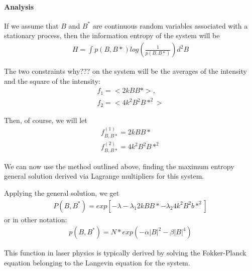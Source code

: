 \documentclass[10 pt,final]{article}
\newcommand{\impo}[1]{{\color{magenta} #1}}
\newcommand{\question}[1]{{\color{blue} #1}}
\begin{document}
\paragraph{Analysis}
If we assume that $B$ and $B^*$ are continuous random variables associated with a stationary process, then the \impo{information entropy} of the system will be
\begin{align*}
H = \int p(B,B*) log(\frac{1}{p(B,B*)}) d^2B
\end{align*}

The \impo{two constraints} \question{why???} on the system will be the averages of the intensity and the square of the intensity:
\begin{align*}
f_1 = <2kBB*>,\\
f_2 = <4k^2B^2B*^2>
\end{align*}

Then, of course, we will let
\begin{align*}
f^{(1)}_{B,B*} = 2kBB* \\
f^{(2)}_{B,B*} = 4k^2B^2B*^2
\end{align*}


We can now use the method outlined above, finding the maximum entropy general solution derived via Lagrange multipliers for this system.

Applying the general solution, we get 
\begin{align*}
P(B,B^*) = exp[-\lambda - \lambda_1 2kBB* - \lambda_2 4k^2 B^2 b*^2]
\end{align*}
or in other notation:
\begin{align*}
p(B,B^*) = N*exp(-\alpha |B|^2 - \beta |B|^4)
\end{align*}

This function in laser physics is typically derived by solving the \impo{Fokker-Planck} equation belonging to the \impo{Langevin equation} for the system. 
\end{document}
